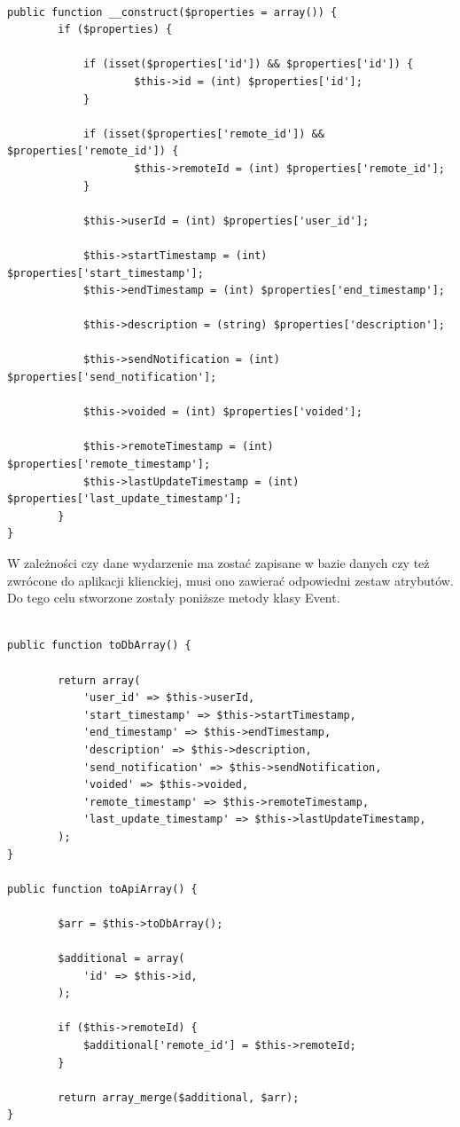 \begin{lstlisting}[caption=Fragment konstruktora klasy Event., label=amb, captionpos=b]

public function __construct($properties = array()) {
    	if ($properties) {

        	if (isset($properties['id']) && $properties['id']) {
            		$this->id = (int) $properties['id'];
        	}

        	if (isset($properties['remote_id']) && $properties['remote_id']) {
            		$this->remoteId = (int) $properties['remote_id'];
        	}

        	$this->userId = (int) $properties['user_id'];

        	$this->startTimestamp = (int) $properties['start_timestamp'];
        	$this->endTimestamp = (int) $properties['end_timestamp'];

        	$this->description = (string) $properties['description'];

        	$this->sendNotification = (int) $properties['send_notification'];

        	$this->voided = (int) $properties['voided'];

        	$this->remoteTimestamp = (int) $properties['remote_timestamp'];
        	$this->lastUpdateTimestamp = (int) $properties['last_update_timestamp'];
    	}
}

\end{lstlisting}

W zależności czy dane wydarzenie ma zostać zapisane w bazie danych czy też zwrócone do aplikacji klienckiej, musi ono zawierać odpowiedni zestaw atrybutów. Do tego celu stworzone zostały poniższe metody klasy Event.

\begin{lstlisting}[caption=Serializacja obiektu Event., label=amb, captionpos=b]

public function toDbArray() {

    	return array(
        	'user_id' => $this->userId,
        	'start_timestamp' => $this->startTimestamp,
        	'end_timestamp' => $this->endTimestamp,
        	'description' => $this->description,
        	'send_notification' => $this->sendNotification,
        	'voided' => $this->voided,
        	'remote_timestamp' => $this->remoteTimestamp,
        	'last_update_timestamp' => $this->lastUpdateTimestamp,
    	);
}

public function toApiArray() {

    	$arr = $this->toDbArray();

    	$additional = array(
        	'id' => $this->id,
    	);

    	if ($this->remoteId) {
        	$additional['remote_id'] = $this->remoteId;
    	}

    	return array_merge($additional, $arr);
}

\end{lstlisting}

